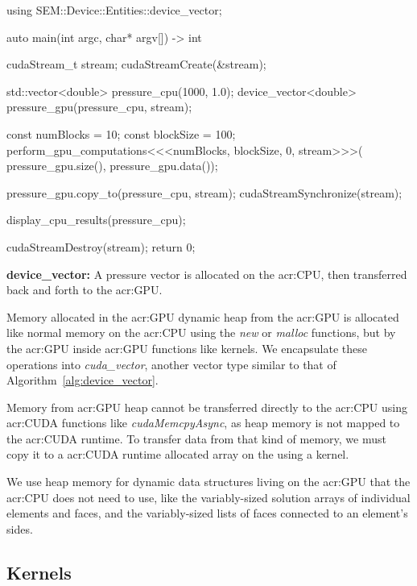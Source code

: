 \begin{algorithm}[H]
    \begin{cuda}
		using SEM::Device::Entities::device_vector;

		auto main(int argc, char* argv[]) -> int {
			cudaStream_t stream;
			cudaStreamCreate(&stream); 

			std::vector<double> pressure_cpu(1000, 1.0);
			device_vector<double> pressure_gpu(pressure_cpu, stream);

			const numBlocks = 10;
			const blockSize = 100;
			perform_gpu_computations<<<numBlocks, blockSize, 0, stream>>>(
				pressure_gpu.size(), pressure_gpu.data());
			
			pressure_gpu.copy_to(pressure_cpu, stream);
			cudaStreamSynchronize(stream);

			display_cpu_results(pressure_cpu);

			cudaStreamDestroy(stream);
			return 0;
		}\end{cuda}
\caption{\textbf{device\_vector:} A pressure vector is allocated on the \acrshort{acr:CPU}, then transferred back and forth to the \acrshort{acr:GPU}.}\label{alg:device_vector}
\end{algorithm}

Memory allocated in the \acrshort{acr:GPU} dynamic heap from the \acrshort{acr:GPU} is allocated
like normal memory on the \acrshort{acr:CPU} using the \textit{new} or \textit{malloc} functions,
but by the \acrshort{acr:GPU} inside \acrshort{acr:GPU} functions like kernels. We encapsulate these
operations into \textit{cuda\_vector}, another vector type similar to that of
Algorithm~\ref{alg:device_vector}.

Memory from \acrshort{acr:GPU} heap cannot be transferred directly to the \acrshort{acr:CPU} using
\acrshort{acr:CUDA} functions like \textit{cudaMemcpyAsync}, as heap memory is not mapped to the
\acrshort{acr:CUDA} runtime. To transfer data from that kind of memory, we must copy it to a
\acrshort{acr:CUDA} runtime allocated array on the using a kernel.

We use heap memory for dynamic data structures living on the \acrshort{acr:GPU} that the
\acrshort{acr:CPU} does not need to use, like the variably-sized solution arrays of individual
elements and faces, and the variably-sized lists of faces connected to an element's sides.

\subsection{Kernels}\label{subsection:graphics_processing_units:implementation:kernels}

